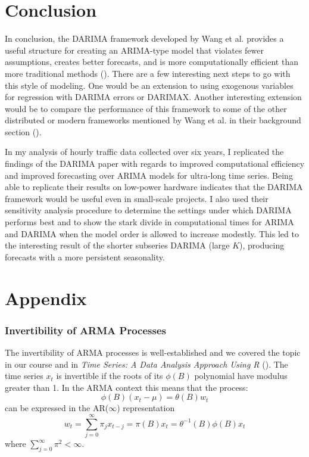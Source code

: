 \documentclass[
]{article}
\begin{document}
\section*{Conclusion}

In conclusion, the DARIMA framework developed by Wang et al. provides a useful structure for creating an ARIMA-type model that violates fewer assumptions, creates better forecasts, and is more computationally efficient than more traditional methods (\cite*{wang_distributed_2020}). There are a few interesting next steps to go with this style of modeling. One would be an extension to using exogenous variables for regression with DARIMA errors or DARIMAX. Another interesting extension would be to compare the performance of this framework to some of the other distributed or modern frameworks mentioned by Wang et al. in their background section (\cite*[p.~7]{wang_distributed_2020}). 

In my analysis of hourly traffic data collected over six years, I replicated the findings of the DARIMA paper with regards to improved computational efficiency and improved forecasting over ARIMA models for ultra-long time series. Being able to replicate their results on low-power hardware indicates that the DARIMA framework would be useful even in small-scale projects. I also used their sensitivity analysis procedure to determine the settings under which DARIMA performs best and to show the stark divide in computational times for ARIMA and DARIMA when the model order is allowed to increase modestly. This led to the interesting result of the shorter subseries DARIMA (large $K$), producing forecasts with a more persistent seasonality. 

\printbibliography
% 
% 

\pagebreak
\section{Appendix}

\subsubsection*{Invertibility of ARMA Processes}
The invertibility of ARMA processes is well-established and we covered the topic in our course and in \textit{Time Series: A Data Analysis Approach Using R} (\cite*[p.~73]{shumway_time_2019}). The time series $x_t$ is invertible if the roots of its $\phi(B)$ polynomial have modulus greater than 1. In the ARMA context this means that the process:
\begin{equation}
  \phi(B)(x_t - \mu) = \theta(B)w_t
\end{equation}
can be expressed in the AR($\infty$) representation 
\begin{equation}
w_t = \sum_{j = 0}^{\infty} \pi_j x_{t-j} = \pi(B) x_t = \theta^{-1}(B)\phi(B)x_t
\end{equation}
where $\sum_{j = 0}^{\infty} \pi^2 < \infty$.
\end{document}
